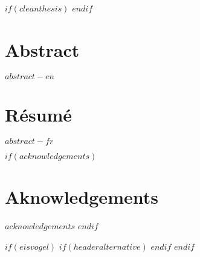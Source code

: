 
$if(cleanthesis)$
\clearpage
\customtitlebackpage
$endif$



\cleardoublepage
\begin{minipage}{\linewidth}

\chapter*{Abstract}
$abstract-en$

\chapter*{Résumé}
$abstract-fr$

\end{minipage}
\cleardoublepage



$if(acknowledgements)$
\chapter*{Aknowledgements}
$acknowledgements$
$endif$


\cleardoublepage



$if(eisvogel)$
\pagestyle{eisvogel-header-footer}
$if(headeralternative)$
\rhead[$date$]{\rightmark}
$endif$
$endif$
